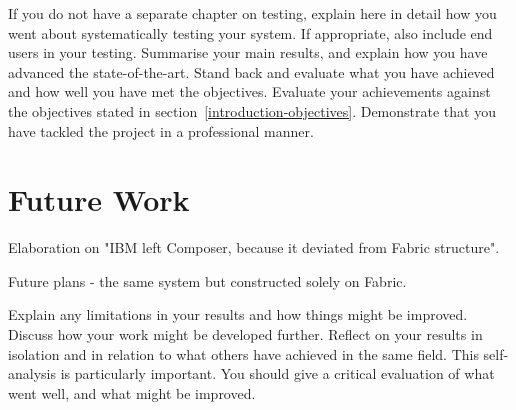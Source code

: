 \documentclass[a4paper,11pt]{report}
\begin{document}
\label{conclusion-evaluation}

If you do not have a separate chapter on testing, explain here in detail how you
went about systematically testing your system. If appropriate, also include
end users in your testing. Summarise your main results, and explain how you have
advanced the state-of-the-art. Stand back and evaluate what you have achieved
and how well you have met the objectives. Evaluate your achievements against the
objectives stated in section~\ref{introduction-objectives}. Demonstrate that you
have tackled the project in a professional manner.

\section{Future Work}

\label{conclusion-future}

Elaboration on "IBM left Composer, because it deviated from Fabric structure".

Future plans - the same system but constructed solely on Fabric.


Explain any limitations in your results and how things might be improved.
Discuss how your work might be developed further. Reflect on your results in
isolation and in relation to what others have achieved in the same field. This
self-analysis is particularly important. You should give a critical evaluation
of what went well, and what might be improved.







\appendix
\end{document}

